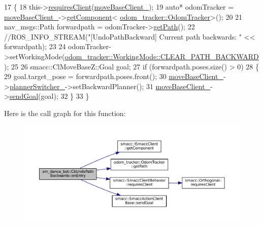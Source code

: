 \begin{DoxyCode}
17   \{
18     this->\hyperlink{classsmacc_1_1SmaccClientBehavior_a917f001e763a1059af337bf4e164f542}{requiresClient}(\hyperlink{classsm__dance__bot_1_1CbUndoPathBackwards_a2e134a879373ea9d29d04f72f707cbc8}{moveBaseClient\_});
19     \textcolor{keyword}{auto}* odomTracker = \hyperlink{classsm__dance__bot_1_1CbUndoPathBackwards_a2e134a879373ea9d29d04f72f707cbc8}{moveBaseClient\_}->\hyperlink{classsmacc_1_1ISmaccClient_adef78db601749ca63c19e74a27cb88cc}{getComponent}<
      \hyperlink{classodom__tracker_1_1OdomTracker}{odom\_tracker::OdomTracker}>();
20 
21     nav\_msgs::Path forwardpath = odomTracker->\hyperlink{classodom__tracker_1_1OdomTracker_a33cb7ab3947b27bf61fabb5be2dd87c9}{getPath}();
22     \textcolor{comment}{//ROS\_INFO\_STREAM("[UndoPathBackward] Current path backwards: " << forwardpath);}
23 
24     odomTracker->setWorkingMode(\hyperlink{namespaceodom__tracker_a4daf27fd157b1a481fdfd6f90de00b88a0cf8f27617189e35619df3c18bda6274}{odom\_tracker::WorkingMode::CLEAR\_PATH\_BACKWARD}
      );
25 
26     smacc::ClMoveBaseZ::Goal goal;
27     \textcolor{keywordflow}{if} (forwardpath.poses.size() > 0)
28     \{
29       goal.target\_pose = forwardpath.poses.front();
30       \hyperlink{classsm__dance__bot_1_1CbUndoPathBackwards_a2e134a879373ea9d29d04f72f707cbc8}{moveBaseClient\_}->\hyperlink{classsmacc_1_1ClMoveBaseZ_a712e0df77c9629930e03cbb4c539b485}{plannerSwitcher\_}->setBackwardPlanner();
31       \hyperlink{classsm__dance__bot_1_1CbUndoPathBackwards_a2e134a879373ea9d29d04f72f707cbc8}{moveBaseClient\_}->\hyperlink{classsmacc_1_1SmaccActionClientBase_a58c67a87c5fb8ea1633573c58fe3eee1}{sendGoal}(goal);
32     \}
33   \}
\end{DoxyCode}


Here is the call graph for this function\+:
\nopagebreak
\begin{figure}[H]
\begin{center}
\leavevmode
\includegraphics[width=350pt]{classsm__dance__bot_1_1CbUndoPathBackwards_a5ecdf83df96ab3d74eb4e4febea7fa74_cgraph}
\end{center}
\end{figure}




